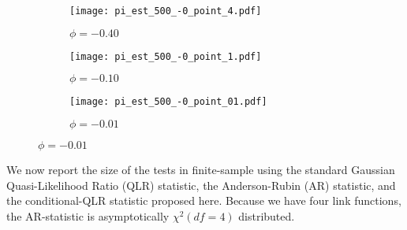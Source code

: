 \documentclass[11pt, letterpaper, twoside]{article}
\begin{document}
\begin{figure}[htb]
  
  \caption[t-statistics]{Parameter Estimates}
  \label{fig:sim_parameter_estimates}


  \begin{subfigure}[t]{.32\textwidth}
    \caption[phi = -0.40]{$\phi = -0.40$}
    \texttt{[image: pi\_est\_500\_-0\_point\_4.pdf]}
  \end{subfigure}
  \begin{subfigure}[t]{.32\textwidth}
    \caption[phi = -0.10]{$\phi = -0.10$}
    \texttt{[image: pi\_est\_500\_-0\_point\_1.pdf]}
  \end{subfigure}
  \begin{subfigure}[t]{.32\textwidth}
    \caption[phi = -0.01]{$\phi = -0.01$}
    \texttt{[image: pi\_est\_500\_-0\_point\_01.pdf]}
  \end{subfigure}

\end{figure}

We now report the size of the tests in finite-sample using the standard Gaussian Quasi-Likelihood Ratio (QLR) statistic, the Anderson-Rubin (AR) statistic, and the conditional-QLR statistic proposed here.  Because we have four link functions, the AR-statistic is asymptotically $\chi^2(df=4)$ distributed.
\end{document}
